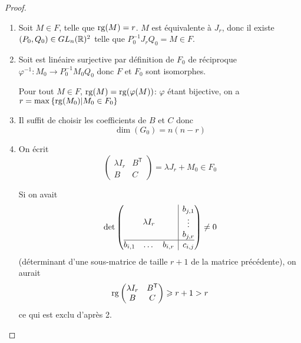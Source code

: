 \documentclass[12pt]{article}
\begin{document}
\begin{proof}
    \phantom{}
    \begin{enumerate}
        \item Soit $M\in F$, telle que $\operatorname{rg}(M)=r$. $M$ est équivalente à $J_{r}$, donc il existe $(P_{0},Q_{0})\in GL_{n}(\mathbb{R})^{2}$ telle que $P_{0}^{-1}J_{r}Q_{0}=M\in F$.
        
        \item Soit 
        est linéaire surjective par définition de $F_{0}$ de réciproque $\varphi^{-1}\colon M_{0}\to P_{0}^{-1}M_{0}Q_{0}$ donc $F$ et $F_{0}$ sont isomorphes.

        Pour tout $M\in F$, $\operatorname{rg}(M)=\operatorname{rg}(\varphi(M))$: $\varphi$ étant bijective, on a $r=\max\left\lbrace\operatorname{rg}(M_{0})\middle| M_{0}\in F_{0}\right\rbrace$

        \item Il suffit de choisir les coefficients de $B$ et $C$ donc 
        \begin{equation}
            \boxed{\dim(G_{0})=n(n-r)}
        \end{equation}

        \item On écrit 
        \begin{equation}
            \begin{pmatrix}
                \lambda I_{r} & B^{\mathsf{T}}\\
                B & C
            \end{pmatrix}
            =\lambda J_{r}+M_{0}\in F_{0}
        \end{equation}

        Si on avait 
        \begin{equation}
            \det\left(
				\begin{array}{@{}c|c@{}}
				\lambda
				I_{r} &
				\begin{matrix}
				b_{j,1}\\
						\vdots\\
						b_{j,r}
						\end{matrix}
						\\
					\hline
					\begin{matrix}
						b_{i,1} &
						\dots
						& b_{i,r}
						\end{matrix}
						& c_{i,j}
				\end{array}
			\right)\neq0
        \end{equation}
        (déterminant d'une sous-matrice de taille $r+1$ de la matrice précédente), on aurait 
        \begin{equation}
            \operatorname{rg}\begin{pmatrix}
                \lambda I_{r} & B^{\mathsf{T}}\\
                B & C
            \end{pmatrix}\geqslant r+1>r
        \end{equation}
        ce qui est exclu d'après 2.


\end{enumerate}
\end{proof}
\end{document}
